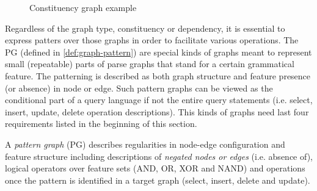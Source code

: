 \begin{figure}[H]
\centering
{}
\caption{Constituency graph example}
\label{fig:mcg-graph}
\end{figure}

Regardless of the graph type, constituency or dependency, it is essential to express patters over those graphs in order to facilitate various operations. The PG (defined in \ref{def:graph-pattern}) are special kinds of graphs meant to represent small (repeatable) parts of parse graphs that stand for a certain grammatical feature. The patterning is described as both graph structure and feature presence (or absence) in node or edge.
Such pattern graphs can be viewed as the conditional part of a query language if not the entire query statements (i.e. select, insert, update, delete operation descriptions). This kinds of graphs need last four requirements listed in the beginning of this section. 

\begin{definition}\label{def:graph-pattern}
	A \textit{pattern graph} (PG) describes regularities in node-edge configuration and feature structure including descriptions of \textit{negated nodes or edges} (i.e. absence of), logical operators over feature sets (AND, OR, XOR and NAND) and operations once the pattern is identified in a target graph (select, insert, delete and update).
\end{definition}

